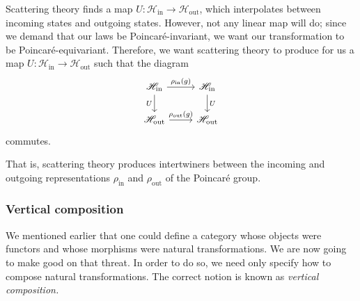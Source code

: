 \documentclass[notes.tex]{subfiles}
\begin{document}
\begin{example}
  Scattering theory finds a map $U\colon \mathscr{H}_{\mathrm{in}} \to \mathscr{H}_{\mathrm{out}}$, which interpolates between incoming states and outgoing states. However, not any linear map will do; since we demand that our laws be Poincaré-invariant, we want our transformation to be Poincaré-equivariant. Therefore, we want scattering theory to produce for us a map $U\colon \mathscr{H}_{\mathrm{in}} \to \mathscr{H}_{\mathrm{out}}$ such that the diagram
  \begin{equation*}
    \begin{tikzcd}
      \mathscr{H}_{\mathrm{in}}
      \arrow[r, "\rho_{\mathrm{in}}(g)"]
      \arrow[d, swap, "U"]
      & \mathscr{H}_{\mathrm{in}}
      \arrow[d, "U"]
      \\
      \mathscr{H}_{\mathrm{out}}
      \arrow[r, "\rho_{\mathrm{out}}(g)"]
      & \mathscr{H}_{\mathrm{out}}
    \end{tikzcd}
  \end{equation*}
  commutes.

  That is, scattering theory produces intertwiners between the incoming and outgoing representations $\rho_{\mathrm{in}}$ and $\rho_{\mathrm{out}}$ of the Poincaré group.
\end{example}


\subsubsection{Vertical composition}

We mentioned earlier that one could define a category whose objects were functors and whose morphisms were natural transformations. We are now going to make good on that threat. In order to do so, we need only specify how to compose natural transformations. The correct notion is known as \emph{vertical composition.}
\end{document}
